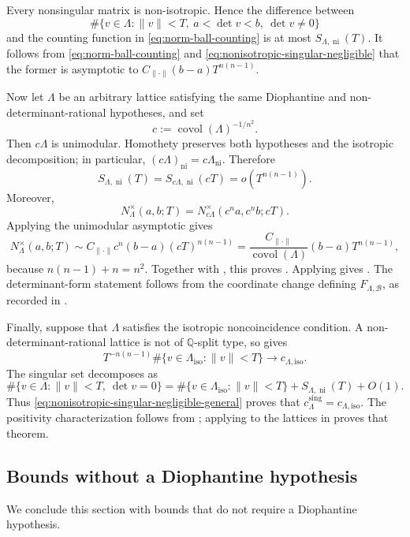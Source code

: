 \documentclass[reqno,11pt]{amsart}
\numberwithin{equation}{section}
\theoremstyle{definition}
\theoremstyle{remark}
\newcommand{\op}{\operatorname}
\newcommand{\covol}{\op{covol}}
\begin{document}
Every nonsingular matrix is non-isotropic. Hence the difference between
$$
\#\{v\in\Lambda:
\|v\|<T,\ a<\det v<b,\ \det v\ne0\}
$$
and the counting function in \eqref{eq:norm-ball-counting} is at most
$S_{\Lambda,\operatorname{ni}}(T)$. It follows from
\eqref{eq:norm-ball-counting} and
\eqref{eq:nonisotropic-singular-negligible} that the former is
asymptotic to $C_{\|\cdot\|}(b-a)T^{n(n-1)}$.

Now let $\Lambda$ be an arbitrary lattice satisfying the same
Diophantine and non-determinant-rational hypotheses, and set
$$
c:=\covol(\Lambda)^{-1/n^2}.
$$
Then $c\Lambda$ is unimodular. Homothety preserves both hypotheses and
the isotropic decomposition; in particular,
$
(c\Lambda)_{\operatorname{ni}}=c\Lambda_{\operatorname{ni}}.
$
Therefore
\begin{equation}\label{eq:nonisotropic-singular-negligible-general}
S_{\Lambda,\operatorname{ni}}(T)
=
S_{c\Lambda,\operatorname{ni}}(cT)
=
o(T^{n(n-1)}).
\end{equation}
Moreover,
$$
N_\Lambda^\times(a,b;T)
=
N_{c\Lambda}^\times(c^na,c^nb;cT).
$$
Applying the unimodular asymptotic gives
$$
N_\Lambda^\times(a,b;T)
\sim
C_{\|\cdot\|}c^n(b-a)(cT)^{n(n-1)}
=
\frac{C_{\|\cdot\|}}{\covol(\Lambda)}
(b-a)T^{n(n-1)},
$$
because $n(n-1)+n=n^2$. Together with , this
proves . Applying
 gives . The
determinant-form statement follows from the coordinate change defining
$F_{\Lambda,\mathcal B}$, as recorded in .

Finally, suppose that $\Lambda$ satisfies the isotropic noncoincidence
condition. A non-determinant-rational lattice is not of
$\mathbb Q$-split type, so  gives
$$
T^{-n(n-1)}\#\{v\in\Lambda_{\operatorname{iso}}:\|v\|<T\}
\to c_{\Lambda,\mathrm{iso}}.
$$
The singular set decomposes as
$$
\#\{v\in\Lambda:\|v\|<T,\ \det v=0\}
=
\#\{v\in\Lambda_{\operatorname{iso}}:\|v\|<T\}
+
S_{\Lambda,\operatorname{ni}}(T)
+O(1).
$$
Thus \eqref{eq:nonisotropic-singular-negligible-general} proves
that
$
c_\Lambda^{\operatorname{sing}}=c_{\Lambda,\mathrm{iso}}.
$
The positivity characterization follows from
; applying
 to the lattices in
 proves that theorem.


\subsection{Bounds without a Diophantine hypothesis}
\label{subsec:general-bounds}
We conclude this section with bounds that do not require a
Diophantine hypothesis.
\end{document}
